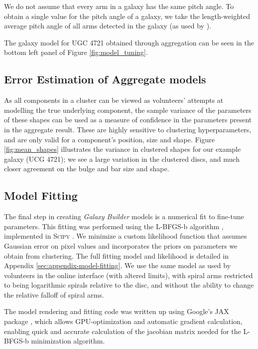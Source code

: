 \documentclass[trackchanges]{aastex63}
\begin{document}
We do not assume that every arm in a galaxy has the same pitch angle. To obtain a single value for the pitch angle of a galaxy, we take the length-weighted average pitch angle of all arms detected in the galaxy (as used by \citealt{Davis2014:1402.1910v1}).

The galaxy model for UGC 4721 obtained through aggregation can be seen in the bottom left panel of Figure \ref{fig:model_tuning}.


\subsection{Error Estimation of Aggregate models}
\label{sec:error_estimation}

As all components in a cluster can be viewed as volunteers' attempts at modelling the true underlying component, the sample variance of the parameters of these shapes can be used as a measure of confidence in the parameters present in the aggregate result. These are highly sensitive to clustering hyperparameters, and are only valid for a component's position, size and shape. Figure \ref{fig:mean_shapes} illustrates the variance in clustered shapes for our example galaxy (UCG 4721); we see a large variation in the clustered discs, and much closer agreement on the bulge and bar size and shape.

\subsection{Model Fitting}

The final step in creating \textit{Galaxy Builder} models is a numerical fit to fine-tune parameters. This fitting was performed using the L-BFGS-b algorithm \citep{doi:10.1137/0916069}, implemented in \textsc{Scipy} \citep{scipy-paper}. We minimize a custom likelihood function that assumes Gaussian error on pixel values and incorporates the priors on parameters we obtain from clustering. The full fitting model and likelihood is detailed in Appendix \ref{sec:appendix-model-fitting}. We use the same model as used by volunteers in the online interface (with altered limits), with spiral arms restricted to being logarithmic spirals relative to the disc, and without the ability to change the relative falloff of spiral arms.

The model rendering and fitting code was written up using Google's JAX package \citep{jax2018github}, which allows GPU-optimization and automatic gradient calculation, enabling quick and accurate calculation of the jacobian matrix needed for the L-BFGS-b minimization algorithm.
\end{document}
